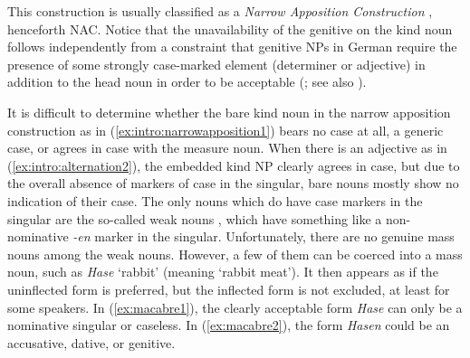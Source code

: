 \begin{exe}
  \ex\label{ex:intro:narrowapposition}
  \begin{xlist}
  \end{xlist}
\end{exe}

This construction is usually classified as a \textit{Narrow Apposition Construction} \citep{Loebel1986}, henceforth NAC.
Notice that the unavailability of the genitive on the kind noun follows independently from a constraint that genitive NPs in German require the presence of some strongly case-marked element (determiner or adjective) in addition to the head noun in order to be acceptable (\citealp{GallmannLindauer1994,Schachtl1989}; see also \citealp[160]{Eisenberg2013b}).

It is difficult to determine whether the bare kind noun in the narrow apposition construction as in (\ref{ex:intro:narrowapposition1}) bears no case at all, a generic case, or agrees in case with the measure noun.
When there is an adjective as in (\ref{ex:intro:alternation2}), the embedded kind NP clearly agrees in case, but due to the overall absence of markers of case in the singular, bare nouns mostly show no indication of their case.
The only nouns which do have case markers in the singular are the so-called weak nouns \citep{Koepcke1995,Schaefer2016c}, which have something like a non-nominative \textit{-en} marker in the singular.
Unfortunately, there are no genuine mass nouns among the weak nouns.
However, a few of them can be coerced into a mass noun, such as \textit{Hase} `rabbit' (meaning `rabbit meat').
It then appears as if the uninflected form is preferred, but the inflected form is not excluded, at least for some speakers.
In (\ref{ex:macabre1}), the clearly acceptable form \textit{Hase} can only be a nominative singular or caseless.
In (\ref{ex:macabre2}), the form \textit{Hasen} could be an accusative, dative, or genitive.

